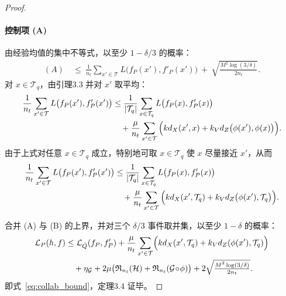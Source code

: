 \begin{proof}
\paragraph{控制项 (A)}
由经验均值的集中不等式，以至少 $1-\delta/3$ 的概率：
\begin{align}
(A) \ &\le\ \frac{1}{n_t}\sum_{x'\in\mathcal T}L\big(f_P(x'),f'_P(x')\big) \ +\ \sqrt{\tfrac{M^2\log(3/\delta)}{2n_t}}.
\end{align}
对 $x\in \mathcal T_q$，由引理3.3 并对 $x'$ 取平均：
\begin{align}
   \frac{1}{n_t}\sum_{x'\in\mathcal T} L\big(f_P(x'),f'_P(x')\big) &\le \frac{1}{|\mathcal T_q|}\sum_{x\in\mathcal T_q} L\big(f_P(x),f'_P(x)\big)\notag \\
   &\quad+\frac{\mu}{n_t}\sum_{x'\in\mathcal T}\Big(k d_X(x',x)+ k_V d_Z\big(\phi(x'),\phi(x)\big)\Big).
\end{align}
由于上式对任意 $x\in\mathcal T_q$ 成立，特别地可取 $x\in\mathcal T_q$ 使 $x$ 尽量接近 $x'$，从而
\begin{align}
   \frac{1}{n_t}\sum_{x'\in\mathcal T} L\big(f_P(x'),f'_P(x')\big) &\le \frac{1}{|\mathcal T_q|}\sum_{x\in\mathcal T_q} L\big(f_P(x),f'_P(x)\big)\notag \\
   &\quad+\frac{\mu}{n_t}\sum_{x'\in\mathcal T}\Big(k d_X(x',\mathcal T_q)+ k_V d_Z\big(\phi(x'),\mathcal T_q\big)\Big).
\end{align}

合并 (A) 与 (B) 的上界，并对三个 $\delta/3$ 事件取并集，以至少 $1-\delta$ 的概率：
\begin{align}
    \mathcal L_{P}(h,f) &\le\mathcal L_{\hat Q}(f_P,f'_P)+\frac{\mu}{n_t}\sum_{x'\in\mathcal T}\!\Big(k d_X(x',\mathcal T_q)+k_V d_Z(\phi(x'),\mathcal T_q)\Big) \notag\\
    &\quad+\eta_{\mathcal G}+2\mu\big(\mathfrak R_{n_t}(\mathcal H)+\mathfrak R_{n_t}(\mathcal G\!\circ\!\phi)\big) +2\sqrt{\tfrac{M^2\log(3/\delta)}{2n_t}}.
\end{align}
即式~\eqref{eq:collab_bound}，定理3.4 证毕。
\end{proof}

